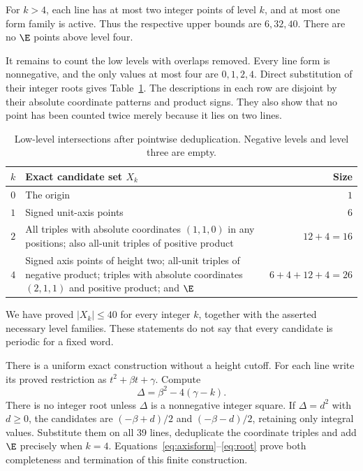 For $k>4$, each line has at most two integer points of level
$k$, and at most one form family is active. Thus the respective
upper bounds are $6,32,40$. There are no $\E$ points above
level four.

It remains to count the low levels with overlaps removed.
Every line form is nonnegative, and the only values at most
four are $0,1,2,4$. Direct substitution of their integer
roots gives Table~\ref{tab:low}. The descriptions in each
row are disjoint by their absolute coordinate patterns and
product signs. They also show that no point has been
counted twice merely because it lies on two lines.

\begin{table}[tb]
\centering\small
\begin{tabular}{@{}cp{}r@{}}
\toprule
$k$ & Exact candidate set $X_k$ & Size\\
\midrule
$0$ & The origin & $1$\\[2pt]
$1$ & Signed unit-axis points & $6$\\[2pt]
$2$ & All triples with absolute coordinates $(1,1,0)$ in any positions;
also all-unit triples of positive product & $12+4=16$\\[2pt]
$4$ & Signed axis points of height two; all-unit triples of negative
product; triples with absolute coordinates $(2,1,1)$ and positive
product; and $\E$ & $6+4+12+4=26$\\
\bottomrule
\end{tabular}
\caption{Low-level intersections after pointwise deduplication.
Negative levels and level three are empty.}
\label{tab:low}
\end{table}

We have proved $|X_k|\le40$ for every integer $k$, together
with the asserted necessary level families. These statements
do not say that every candidate is periodic for a fixed word.

There is a uniform exact construction without a height cutoff.
For each line write its proved restriction as
$t^2+\beta t+\gamma$. Compute
\begin{equation}\label{eq:root}
 \Delta=\beta^2-4(\gamma-k).
\end{equation}
There is no integer root unless $\Delta$ is a nonnegative
integer square. If $\Delta=d^2$ with $d\ge0$, the candidates
are $(-\beta+d)/2$ and $(-\beta-d)/2$, retaining only integral
values. Substitute them on all 39 lines, deduplicate the
coordinate triples and add $\E$ precisely when $k=4$.
Equations~\eqref{eq:axisform}--\eqref{eq:root} prove both
completeness and termination of this finite construction.
